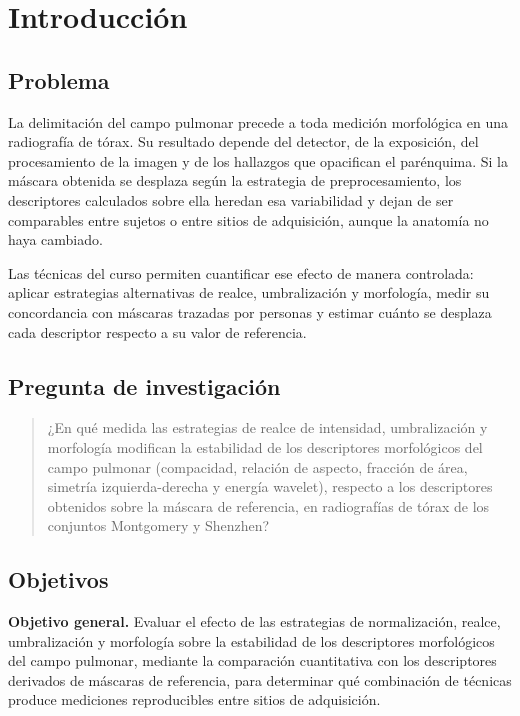 \section{Introducción}

\subsection{Problema}

La delimitación del campo pulmonar precede a toda medición morfológica en una
radiografía de tórax. Su resultado depende del detector, de la exposición, del
procesamiento de la imagen y de los hallazgos que opacifican el parénquima. Si la
máscara obtenida se desplaza según la estrategia de preprocesamiento, los
descriptores calculados sobre ella heredan esa variabilidad y dejan de ser
comparables entre sujetos o entre sitios de adquisición, aunque la anatomía no haya
cambiado.

Las técnicas del curso permiten cuantificar ese efecto de manera controlada:
aplicar estrategias alternativas de realce, umbralización y morfología, medir su
concordancia con máscaras trazadas por personas y estimar cuánto se desplaza cada
descriptor respecto a su valor de referencia.

\subsection{Pregunta de investigación}

\begin{quote}
¿En qué medida las estrategias de realce de intensidad, umbralización y morfología
modifican la estabilidad de los descriptores morfológicos del campo pulmonar
(compacidad, relación de aspecto, fracción de área, simetría izquierda-derecha y
energía wavelet), respecto a los descriptores obtenidos sobre la máscara de
referencia, en radiografías de tórax de los conjuntos Montgomery y Shenzhen?
\end{quote}

\subsection{Objetivos}

\textbf{Objetivo general.} Evaluar el efecto de las estrategias de normalización,
realce, umbralización y morfología sobre la estabilidad de los descriptores
morfológicos del campo pulmonar, mediante la comparación cuantitativa con los
descriptores derivados de máscaras de referencia, para determinar qué combinación
de técnicas produce mediciones reproducibles entre sitios de adquisición.


